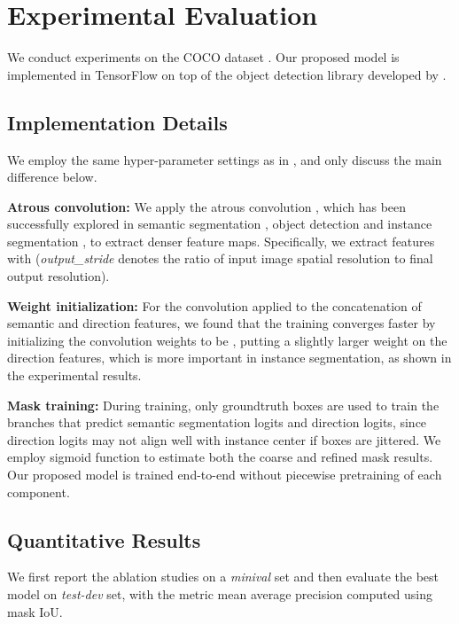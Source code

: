 \section{Experimental Evaluation}
We conduct experiments on the COCO dataset \cite{lin2014microsoft}. Our proposed model is implemented in TensorFlow \cite{abadi2016tensorflow} on top of the object detection library developed by \cite{huang2016speed}.

\subsection{Implementation Details}
We employ the same hyper-parameter settings as in \cite{huang2016speed, sun2017revisiting}, and only discuss the main difference below.

\textbf{Atrous convolution:} We apply the atrous convolution \cite{holschneider1989real, giusti2013fast, sermanet2013overfeat, papandreou2014untangling}, which has been successfully explored in semantic segmentation \cite{chen2015attention, zhao2017pyramid, chen2017rethinking}, object detection \cite{dai2016rfcn, huang2016speed} and instance segmentation \cite{zhang2015monocular, dai2017fully}, to extract denser feature maps. Specifically, we extract features with  (\emph{output\_stride} denotes the ratio of input image spatial resolution to final output resolution).

\textbf{Weight initialization:} For the  convolution applied to the concatenation of semantic and direction features, we found that the training converges faster by initializing the convolution weights to be , putting a slightly larger weight on the direction features, which is more important in instance segmentation, as shown in the experimental results.

\textbf{Mask training:} During training, only groundtruth boxes are used to train the branches that predict semantic segmentation logits and direction logits, since direction logits may not align well with instance center if boxes are jittered. We employ sigmoid function to estimate both the coarse and refined mask results. Our proposed model is trained end-to-end without piecewise pretraining of each component.

\subsection{Quantitative Results}
We first report the ablation studies on a \textit{minival} set and then evaluate the best model on \textit{test-dev} set, with the metric mean average precision computed using mask IoU.

